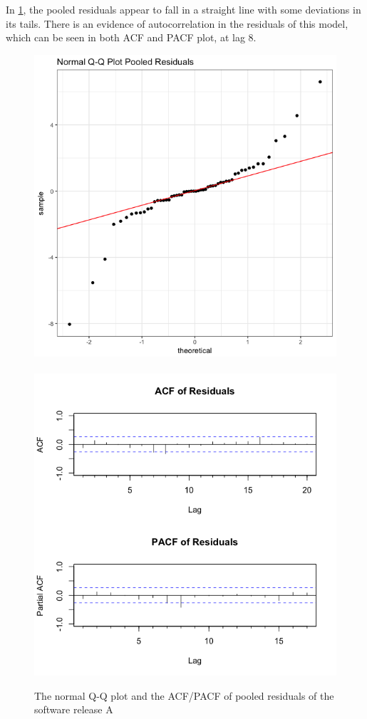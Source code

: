 In \ref{L16A_plotDiag}, the pooled residuals appear to fall in a
straight line with some deviations in its tails. There is an evidence
of autocorrelation in the residuals of this model, which can be seen
in both ACF and PACF plot, at lag 8. 

\begin{figure}[h]
\begin{centering}
\includegraphics[scale=0.3]{picture/L16A_QQPool}$\quad$\includegraphics[scale=0.3]{picture/L16A_ACFPool}
\par\end{centering}
\caption{The normal Q-Q plot and the ACF/PACF of pooled residuals of the software
release A}
\label{L16A_plotDiag}
\end{figure}


